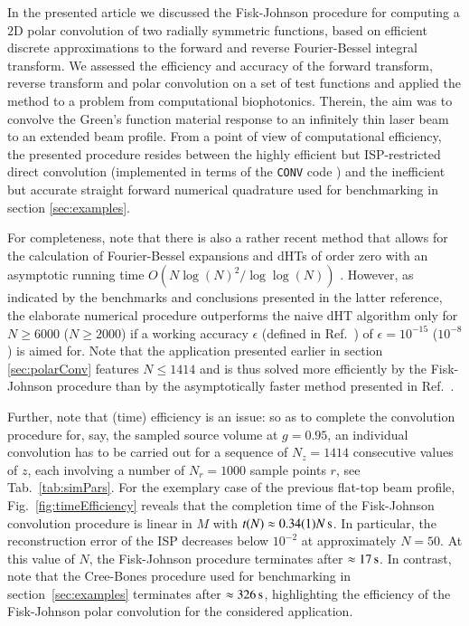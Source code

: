 \documentclass[review]{elsarticle}
\begin{document}
In the presented article we discussed the Fisk-Johnson procedure for computing
a $2$D polar convolution of two radially symmetric functions, based on
efficient discrete approximations to the forward and reverse Fourier-Bessel
integral transform. 
We assessed the efficiency and accuracy of the forward transform, reverse
transform and polar convolution on a set of test functions and applied the
method to a problem from computational biophotonics. Therein, the aim was to
convolve the Green's function material response to an infinitely thin laser
beam to an extended beam profile.
From a point of view of computational efficiency, the presented procedure 
resides between the highly efficient but ISP-restricted direct convolution
(implemented in terms of the {\tt CONV} code \cite{CONV:1997}) and the 
inefficient but accurate straight forward numerical quadrature used for 
benchmarking in section \ref{sec:examples}.

For completeness, note that there is also a rather recent method that allows
for the calculation of Fourier-Bessel expansions and dHTs of order zero with an
asymptotic running time $O(N \log(N)^2/\log\log(N))$ \cite{Townsend:2015}.
However, as indicated by the benchmarks and conclusions presented in the
latter reference, the elaborate numerical procedure outperforms the naive dHT
algorithm only for $N\geq 6000$ ($N\geq 2000$) if a working accuracy $\epsilon$
(defined in Ref.\ \cite{Townsend:2015}) of $\epsilon = 10^{-15}$ ($10^{-8}$) is
aimed for. 
Note that the application presented earlier in section \ref{sec:polarConv}
features $N\leq 1414$ and is thus solved more efficiently by the Fisk-Johnson
procedure than by the asymptotically faster method presented in Ref.\
\cite{Townsend:2015}.

Further, note that (time) efficiency is an issue: so as to complete the
convolution procedure for, say, the sampled source volume at $g=0.95$, an
individual convolution has to be carried out for a sequence of $N_z=1414$
consecutive values of $z$, each involving a number of $N_r=1000$ sample points
$r$, see Tab.~\ref{tab:simPars}. For the exemplary case of the previous
flat-top beam profile, Fig.~\ref{fig:timeEfficiency} reveals that the
completion time of the Fisk-Johnson convolution procedure is linear in $M$ with
$t(N)\approx 0.34(1) N \,{\rm{s}}$. In particular, the reconstruction
error of the ISP decreases below $10^{-2}$ at approximately $N=50$. At this
value of $N$, the Fisk-Johnson procedure terminates after $\approx
17\,{\rm{s}}$.  In contrast, note that the Cree-Bones procedure used for
benchmarking in section~\ref{sec:examples} terminates after $\approx
326\,{\rm{s}}$, highlighting the efficiency of the Fisk-Johnson polar
convolution for the considered application. 
\end{document}
